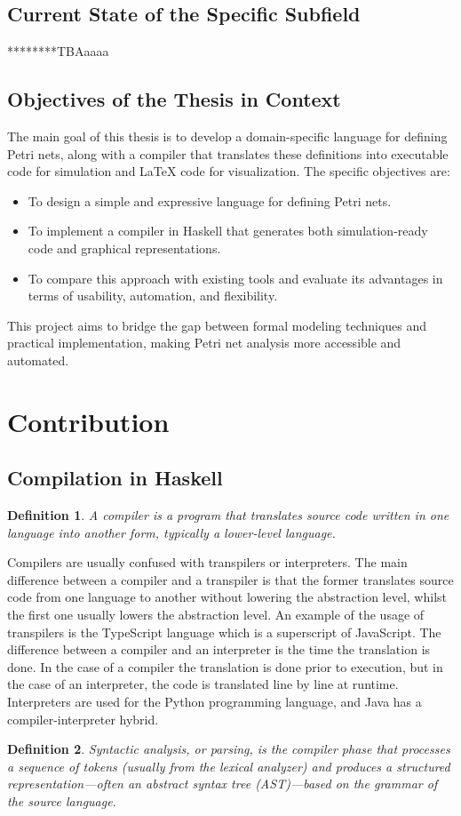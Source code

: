 \documentclass[12pt]{article}
\newtheorem{definition}{Definition}
\begin{document}
    \subsection{Current State of the Specific Subfield}
    ********TBAaaaa
    \subsection{Objectives of the Thesis in Context}
    The main goal of this thesis is to develop a domain-specific language for defining Petri nets, along with a compiler that translates these definitions into executable code for simulation and LaTeX code for visualization. The specific objectives are:
    \begin{itemize}
        \item To design a simple and expressive language for defining Petri nets.
        \item To implement a compiler in Haskell that generates both simulation-ready code and graphical representations.
        \item To compare this approach with existing tools and evaluate its advantages in terms of usability, automation, and flexibility.
    \end{itemize}
    This project aims to bridge the gap between formal modeling techniques and practical implementation, making Petri net analysis more accessible and automated.
    
\section{Contribution}
    \subsection{Compilation in Haskell}
        \begin{definition}
            A compiler is a program that translates source code written in one language into another form, typically a lower-level language.
        \end{definition}
        Compilers are usually confused with transpilers or interpreters. 
        The main difference between a compiler and a transpiler is that the former translates source code from one language to another without lowering the abstraction level, whilst the first one usually lowers the abstraction level. An example of the usage of transpilers is the TypeScript language which is a superscript of JavaScript.
        The difference between a compiler and an interpreter is the time the translation is done. In the case of a compiler the translation is done prior to execution, but in the case of an interpreter, the code is translated line by line at runtime. Interpreters are used for the Python programming language, and Java has a compiler-interpreter hybrid.
        \cite{alfred2007compilers}
        \begin{definition}
            Syntactic analysis, or parsing, is the compiler phase that processes a sequence of tokens (usually from the lexical analyzer) and produces a structured representation—often an abstract syntax tree (AST)—based on the grammar of the source language.
        \end{definition}
        
\end{document}
